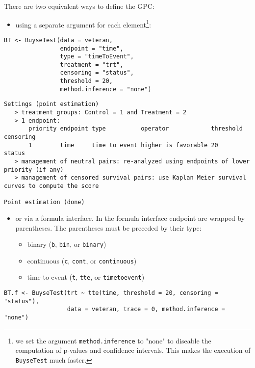 \documentclass[12pt]{article}
\begin{document}
\bigskip

There are two equivalent ways to define the GPC: 
\begin{itemize}
\item using a separate argument for each element\footnote{we set the argument \texttt{method.inference} to "none" to diseable
the computation of p-values and confidence intervals. This makes the
execution of \texttt{BuyseTest} much faster.}:
\end{itemize}


\lstset{language=r,label= ,caption= ,captionpos=b,numbers=none}
\begin{lstlisting}
BT <- BuyseTest(data = veteran, 
				endpoint = "time", 
				type = "timeToEvent", 
				treatment = "trt", 
				censoring = "status", 
				threshold = 20,
				method.inference = "none")
\end{lstlisting}

\begin{verbatim}
Settings (point estimation) 
   > treatment groups: Control = 1 and Treatment = 2
   > 1 endpoint: 
       priority endpoint type          operator            threshold censoring
       1        time     time to event higher is favorable 20        status   
   > management of neutral pairs: re-analyzed using endpoints of lower priority (if any) 
   > management of censored survival pairs: use Kaplan Meier survival curves to compute the score 

Point estimation (done)
\end{verbatim}

\clearpage

\begin{itemize}
\item or via a formula interface. In the formula interface endpoint are
wrapped by parentheses. The parentheses must be preceded by their
type: 
\begin{itemize}[label={-}]
\item binary (\texttt{b}, \texttt{bin}, or \texttt{binary})
\item continuous (\texttt{c}, \texttt{cont}, or  \texttt{continuous})
\item time to event (\texttt{t}, \texttt{tte}, or \texttt{timetoevent})
\end{itemize}
\end{itemize}

\lstset{language=r,label= ,caption= ,captionpos=b,numbers=none}
\begin{lstlisting}
BT.f <- BuyseTest(trt ~ tte(time, threshold = 20, censoring = "status"),
				  data = veteran, trace = 0, method.inference = "none")
\end{lstlisting}
\end{document}
